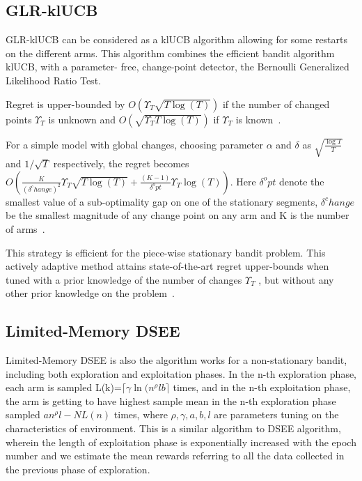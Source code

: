 \subsection{GLR-klUCB}\label{subsec:glr-klucb}
GLR-klUCB can be considered as a klUCB algorithm allowing for some restarts on the different arms. This algorithm combines the efficient bandit algorithm klUCB, with a parameter- free, change-point detector, the Bernoulli Generalized Likelihood Ratio Test.
\par
Regret is upper-bounded by $ O\left(\Upsilon_T \sqrt{T \log\left(T\right)} \right)$ if the number of changed points $\Upsilon_T $ is unknown and $ O\left(\sqrt{\Upsilon_T T \log\left(T\right)} \right)$ if  $\Upsilon_T $ is known~\citep{Besson2019}.
\par
For a simple model with global changes, choosing parameter $\alpha$ and $\delta $ as $\sqrt{\frac{\log T}{T}}$ and $1/\sqrt{T}$ respectively, the regret becomes $O\left(\frac{K}{\left(\delta^change\right)^2} \Upsilon_T \sqrt{T \log\left(T\right)}+\frac{\left(K-1\right)}{\delta^opt} \Upsilon_T \log\left(T\right)\right)$.
Here $\delta^opt$ denote the smallest value of a sub-optimality gap on one of the stationary segments, $\delta^change$ be the smallest magnitude of any change point on any arm and K is the number of arms~\citep{Besson2019}.
\par
This strategy is efficient for the piece-wise stationary bandit problem.
This actively adaptive method attains state-of-the-art regret upper-bounds when tuned with a prior knowledge of the number of changes $ \Upsilon_T $ , but without any other prior knowledge on the problem~\citep{Besson2019}.


\subsection{Limited-Memory DSEE} %
Limited-Memory DSEE is also the algorithm works for a non-stationary bandit, including both exploration and exploitation phases. In the n-th exploration phase, each arm is sampled L(k)=$\lceil\gamma\ln({n^{\rho}lb}\rceil$ times, and in the n-th exploitation phase, the arm is getting to have highest sample mean in the n-th exploration phase sampled $an^{\rho}l-NL(n)$ times, where $\rho, \gamma,a,b,l$ are parameters tuning on the characteristics of environment.
\newline This is a similar algorithm to DSEE algorithm, wherein the length of exploitation phase is exponentially increased with the epoch number and we estimate the mean rewards referring to all the data collected in the previous phase of exploration.\citep{wei2018abruptly}

